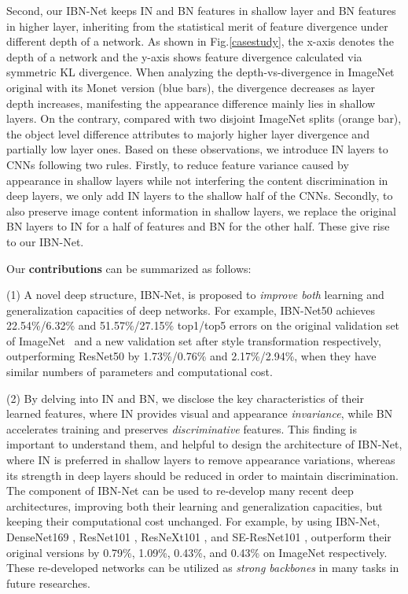 \documentclass[runningheads]{llncs}
\begin{document}
Second, our IBN-Net keeps IN and BN features in shallow layer and BN features in higher layer, inheriting from the statistical merit of feature divergence under different depth of a network. 
As shown in Fig.\ref{casestudy}, the x-axis denotes the depth of a network and the y-axis shows feature divergence calculated via symmetric KL divergence. 
When analyzing the depth-vs-divergence in ImageNet original with its Monet version (blue bars), the divergence decreases as layer depth increases, manifesting the appearance difference mainly lies in shallow layers. 
On the contrary, compared with two disjoint ImageNet splits (orange bar), the object level difference attributes to majorly higher layer divergence and partially low layer ones.
Based on these observations, we introduce IN layers to CNNs following two rules. 
Firstly, to reduce feature variance caused by appearance in shallow layers while not interfering the content discrimination in deep layers, we only add IN layers to the shallow half of the CNNs. 
Secondly, to also preserve image content information in shallow layers, we replace the original BN layers to IN for a half of features and BN for the other half. 
These give rise to our IBN-Net.

Our \textbf{contributions} can be summarized as follows:

(1) A novel deep structure, IBN-Net, is proposed to \emph{improve both} learning and generalization capacities of deep networks.
For example, IBN-Net50 achieves 22.54\%/6.32\% and 51.57\%/27.15\% top1/top5 errors on the original validation set of ImageNet~\cite{deng2009imagenet} and a new validation set after style transformation respectively, outperforming ResNet50 by 1.73\%/0.76\% and 2.17\%/2.94\%, when they have similar numbers of parameters and computational cost.

(2) By delving into IN and BN, we disclose the key characteristics of their learned features, where IN provides visual and appearance \emph{invariance}, while BN accelerates training and preserves \emph{discriminative} features.
This finding is important to understand them, and helpful to design the architecture of IBN-Net, where IN is preferred in shallow layers to remove appearance variations, whereas its strength in deep layers should be reduced in order to maintain discrimination.
The component of IBN-Net can be used to re-develop many recent deep architectures, improving both their learning and generalization capacities, but keeping their computational cost unchanged.
For example, by using IBN-Net, DenseNet169 \cite{huang2017densely}, ResNet101 \cite{he2016deep}, ResNeXt101 \cite{xie2017aggregated}, and SE-ResNet101 \cite{hu2017squeeze}, outperform their original versions by 0.79\%, 1.09\%, 0.43\%, and 0.43\% on ImageNet respectively.
These re-developed networks can be utilized as \emph{strong backbones} in many tasks in future researches. 
\end{document}
